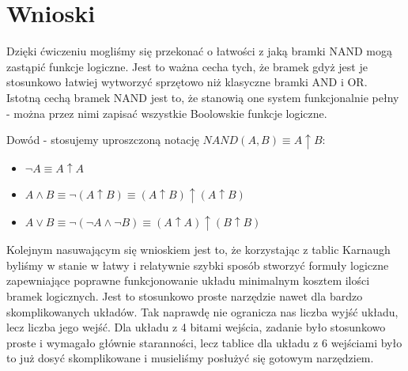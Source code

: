 \documentclass[a4paper]{article}
\begin{document}
\section{Wnioski}
Dzięki ćwiczeniu mogliśmy się przekonać o łatwości z jaką bramki NAND mogą zastąpić funkcje logiczne. Jest to 
ważna cecha tych, że bramek gdyż jest je stosunkowo łatwiej wytworzyć sprzętowo niż klasyczne bramki AND i OR. 
Istotną cechą bramek NAND jest to, że stanowią one system funkcjonalnie pełny - można przez nimi zapisać wszystkie
Boolowskie funkcje logiczne.

Dowód - stosujemy uproszczoną notację $NAND(A, B) \equiv A \uparrow B$:
\begin{itemize}
  \item $\lnot A \equiv A \uparrow A$
  \item $A \land B \equiv \lnot (A \uparrow B) \equiv (A \uparrow B) \uparrow (A \uparrow B)$
  \item $A \lor B \equiv \lnot (\lnot A \land \lnot B) \equiv (A \uparrow A) \uparrow (B \uparrow B)$ 
\end{itemize}

Kolejnym nasuwającym się wnioskiem jest to, że korzystając z tablic Karnaugh byliśmy w stanie w łatwy i relatywnie szybki
sposób stworzyć formuły logiczne zapewniające poprawne funkcjonowanie układu minimalnym kosztem ilości bramek logicznych. 
Jest to stosunkowo proste narzędzie nawet dla bardzo skomplikowanych układów. Tak naprawdę nie ogranicza nas liczba wyjść układu, 
lecz liczba jego wejść. Dla układu z 4 bitami wejścia, zadanie było stosunkowo proste i wymagało głównie staranności, lecz tablice
dla układu z 6 wejściami było to już dosyć skomplikowane i musieliśmy posłużyć się gotowym narzędziem.
\end{document}
